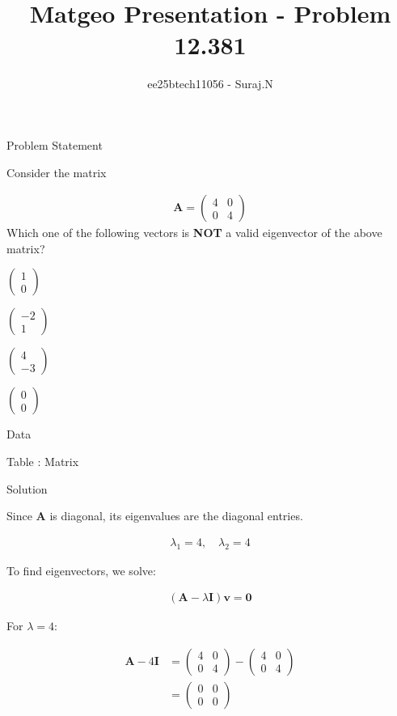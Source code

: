 \documentclass{beamer}
\title{Matgeo Presentation - Problem 12.381}
\author{ee25btech11056 - Suraj.N}
\numberwithin{equation}{section}
\theoremstyle{remark}
\newcommand{\myvec}[1]{\ensuremath{\begin{pmatrix}#1\end{pmatrix}}}
\let\vec\mathbf
\begin{document}
\begin{frame}
  \titlepage
\end{frame}

\begin{frame}{Problem Statement}

Consider the matrix

\begin{align*}
\vec{A} = \myvec{4 & 0 \\ 0 & 4}
\end{align*}
Which one of the following vectors is \textbf{NOT} a valid eigenvector of the above matrix?

\begin{itemize}
\begin{multicols}{4}
\item $\myvec{1\\0}$
\item $\myvec{-2\\1}$
\item $\myvec{4\\-3}$
\item $\myvec{0\\0}$
\end{multicols}
\end{itemize}

\end{frame}

\begin{frame}{Data}

\begin{table}[h!]
  \centering
  
  \caption*{Table : Matrix}
  \label{12.381}
\end{table}

\end{frame}

\begin{frame}{Solution}

Since $\vec{A}$ is diagonal, its eigenvalues are the diagonal entries.

\begin{align}
\lambda_1 = 4,\quad \lambda_2 = 4
\end{align}

To find eigenvectors, we solve:

\begin{align}
  (\vec{A}-\lambda\vec{I})\vec{v} = \vec{0}
\end{align}

For $\lambda = 4$:

\begin{align}
  \vec{A}-4\vec{I} &= \myvec{4 & 0 \\ 0 & 4} - \myvec{4 & 0 \\ 0 & 4} \\
&= \myvec{0 & 0 \\ 0 & 0}
\end{align}

\end{frame}
\end{document}
